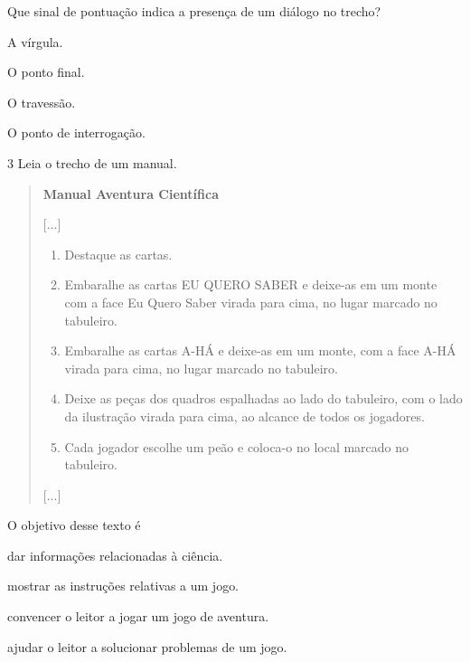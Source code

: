 Que sinal de pontuação indica a presença de um diálogo no trecho?

\begin{escolha}
\item
  A vírgula.
\item
  O ponto final.
\item
  O travessão.
\item
  O ponto de interrogação.
\end{escolha}


\num{3} Leia o trecho de um manual.

\begin{quote}
\textbf{Manual Aventura Científica}

{[}...{]}

\begin{enumerate}
\item Destaque as cartas.
\item Embaralhe as cartas EU QUERO SABER e deixe-as em um monte com a
face Eu Quero Saber virada para cima, no lugar marcado no tabuleiro.
\item Embaralhe as cartas A-HÁ e deixe-as em um monte, com a face A-HÁ
virada para cima, no lugar marcado no tabuleiro.
\item Deixe as peças dos quadros espalhadas ao lado do tabuleiro, com o
lado da ilustração virada para cima, ao alcance de todos os jogadores.
\item Cada jogador escolhe um peão e coloca-o no local marcado no
tabuleiro.
\end{enumerate}

{[}...{]}

\end{quote}

O objetivo desse texto é

\begin{escolha}
\item dar informações relacionadas à ciência.

\item mostrar as instruções relativas a um jogo.

\item convencer o leitor a jogar um jogo de aventura.

\item ajudar o leitor a solucionar problemas de um jogo.
\end{escolha}

